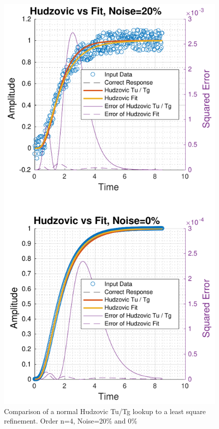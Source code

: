 \begin{figure}[t]
    \includegraphics[width=\linewidth]{images/hudzovic_vs_fit}
    \caption{Comparison of a normal Hudzovic Tu/Tg lookup to a least square refinement. Order n=4, Noise=20\% and 0\%}
    \label{fig:hudzovic_vs_fit}
\end{figure}

